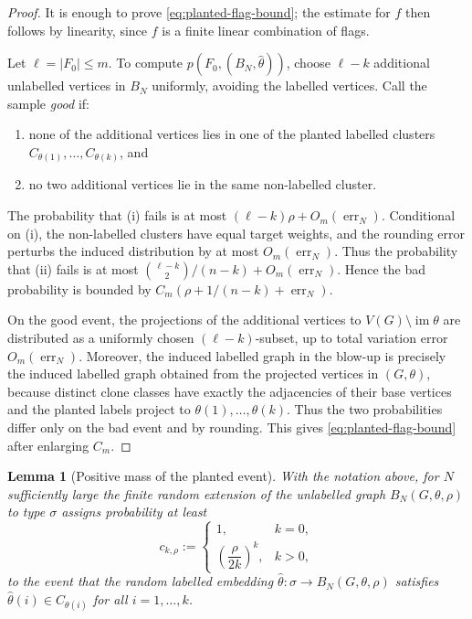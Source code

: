 \documentclass[11pt]{article}
\newtheorem{lemma}[theorem]{Lemma}
\theoremstyle{definition}
\begin{document}
\begin{proof}
It is enough to prove \eqref{eq:planted-flag-bound}; the estimate for $f$ then
follows by linearity, since $f$ is a finite linear combination of flags.

Let $\ell=|F_0|\le m$.  To compute $p(F_0,(B_N,\widehat\theta))$, choose
$\ell-k$ additional unlabelled vertices in $B_N$ uniformly, avoiding the labelled
vertices.  Call the sample \emph{good} if:
\begin{enumerate}[label=\textup{(\roman*)}, leftmargin=2.8em]
  \item none of the additional vertices lies in one of the planted labelled
  clusters $C_{\theta(1)},\ldots,C_{\theta(k)}$, and
  \item no two additional vertices lie in the same non-labelled cluster.
\end{enumerate}
The probability that (i) fails is at most $(\ell-k)\rho+O_m(\operatorname{err}_N)$.
Conditional on (i), the non-labelled clusters have equal target weights, and the
rounding error perturbs the induced distribution by at most
$O_m(\operatorname{err}_N)$.  Thus the probability that (ii) fails is at most
$\binom{\ell-k}{2}/(n-k)+O_m(\operatorname{err}_N)$.  Hence the bad probability is bounded by
$C_m(\rho+1/(n-k)+\operatorname{err}_N)$.

On the good event, the projections of the additional vertices to
$V(G)\setminus\operatorname{im}\theta$ are distributed as a uniformly
chosen $(\ell-k)$-subset, up to total variation error $O_m(\operatorname{err}_N)$.  Moreover, the induced
labelled graph in the blow-up is precisely the induced labelled graph obtained
from the projected vertices in $(G,\theta)$, because distinct clone classes have
exactly the adjacencies of their base vertices and the planted labels project to
$\theta(1),\ldots,\theta(k)$.  Thus the two probabilities differ only on the bad
event and by rounding.  This gives \eqref{eq:planted-flag-bound} after enlarging
$C_m$.
\end{proof}

\begin{lemma}[Positive mass of the planted event]\label{lem:positive-mass}
With the notation above, for $N$ sufficiently large the finite random extension
of the unlabelled graph $B_N(G,\theta,\rho)$ to type $\sigma$ assigns probability
at least
\[
  c_{k,\rho}:=
  \begin{cases}
    1, & k=0,\\[2mm]
    \left(\dfrac{\rho}{2k}\right)^k, & k>0,
  \end{cases}
\]
to the event that the random labelled embedding
$\widehat\theta:\sigma\to B_N(G,\theta,\rho)$ satisfies
$\widehat\theta(i)\in C_{\theta(i)}$ for all $i=1,
\ldots,k$.
\end{lemma}
\end{document}
